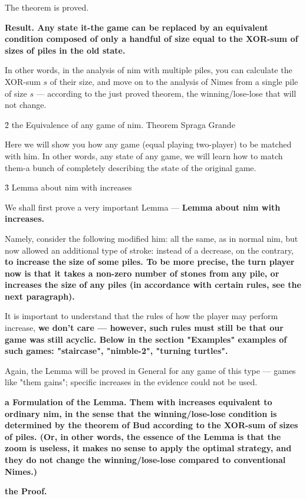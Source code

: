 The theorem is proved.

\bf{Result}. Any state it-the game can be replaced by an equivalent condition composed of only a handful of size equal to the XOR-sum of sizes of piles in the old state.

In other words, in the analysis of nim with multiple piles, you can calculate the XOR-sum $s$ of their size, and move on to the analysis of Nimes from a single pile of size $s$ --- according to the just proved theorem, the winning/lose-lose that will not change.


\h2{ the Equivalence of any game of nim. Theorem Spraga Grande }

Here we will show you how any game (equal playing two-player) to be matched with him. In other words, any state of any game, we will learn how to match them-a bunch of completely describing the state of the original game.


\h3{ Lemma about nim with increases }

We shall first prove a very important Lemma --- \bf{Lemma about nim with increases}.

Namely, consider the following modified him: all the same, as in normal nim, but now allowed an additional type of stroke: instead of a decrease, on the contrary, \bf{to increase the size of some piles}. To be more precise, the turn player now is that it takes a non-zero number of stones from any pile, or increases the size of any piles (in accordance with certain rules, see the next paragraph).

It is important to understand that the rules of how the player may perform increase, \bf{we don't care} --- however, such rules must still be that our game was still \bf{acyclic}. Below in the section "Examples" examples of such games: "staircase", "nimble-2", "turning turtles".

Again, the Lemma will be proved in General for any game of this type --- games like "them gains"; specific increases in the evidence could not be used.

\bf{a Formulation of the Lemma}. Them with increases equivalent to ordinary nim, in the sense that the winning/lose-lose condition is determined by the theorem of Bud according to the XOR-sum of sizes of piles. (Or, in other words, the essence of the Lemma is that the zoom is useless, it makes no sense to apply the optimal strategy, and they do not change the winning/lose-lose compared to conventional Nimes.)

\bf{the Proof}.

